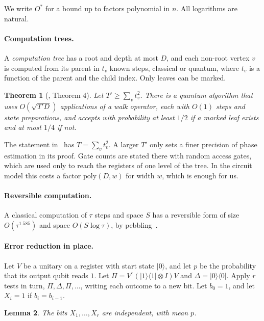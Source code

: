 \documentclass[11pt]{article}
\newtheorem{theorem}{Theorem}[section]
\newtheorem{lemma}[theorem]{Lemma}
\theoremstyle{definition}
\theoremstyle{remark}
\newcommand{\poly}{\mathrm{poly}}
\begin{document}
We write $O^*$ for a bound up to factors polynomial in $n$. All logarithms are natural.

\paragraph{Computation trees.} A \emph{computation tree} has a root and depth at most $D$, and each non-root vertex $v$ is computed from its parent in $t_v$ known steps, classical or quantum, where $t_v$ is a function of the parent and the child index. Only leaves can be marked.

\begin{theorem}[\cite{Vih25}, Theorem 4]\label{thm:walk}
Let $T'\ge\sum_v t_v^2$. There is a quantum algorithm that uses $O(\sqrt{T'D})$ applications of a walk operator, each with $O(1)$ steps and state preparations, and accepts with probability at least $1/2$ if a marked leaf exists and at most $1/4$ if not.
\end{theorem}

The statement in~\cite{Vih25} has $T=\sum_v t_v^2$. A larger $T'$ only sets a finer precision of phase estimation in its proof. Gate counts are stated there with random access gates, which are used only to reach the registers of one level of the tree. In the circuit model this costs a factor $\poly(D,w)$ for width $w$, which is enough for us.

\paragraph{Reversible computation.} A classical computation of $\tau$ steps and space $S$ has a reversible form of size $O(\tau^{1.585})$ and space $O(S\log\tau)$, by pebbling~\cite{Ben89}.

\paragraph{Error reduction in place.} Let $V$ be a unitary on a register with start state $|0\rangle$, and let $p$ be the probability that its output qubit reads $1$. Let $\Pi=V^\dagger(|1\rangle\langle1|\otimes I)V$ and $\Delta=|0\rangle\langle0|$. Apply $r$ tests in turn, $\Pi,\Delta,\Pi,\dots$, writing each outcome to a new bit. Let $b_0=1$, and let $X_i=1$ if $b_i=b_{i-1}$.

\begin{lemma}\label{lem:bits}
The bits $X_1,\dots,X_r$ are independent, with mean $p$.
\end{lemma}
\end{document}

